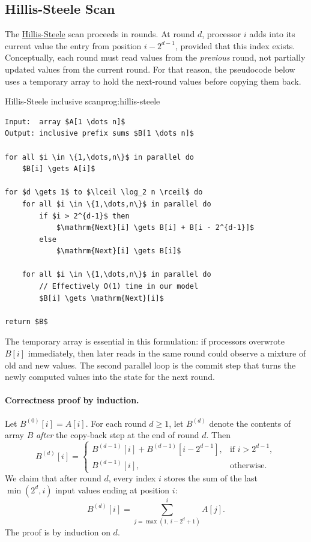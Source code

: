 \subsection{Hillis-Steele Scan}
The \hyperref[prog:hillis-steele]{Hillis-Steele} scan proceeds in rounds. At round $d$, processor $i$ adds into
its current value the entry from position $i - 2^{d-1}$, provided that this index
exists. Conceptually, each round must read values from the \emph{previous} round,
not partially updated values from the current round. For that reason, the
pseudocode below uses a temporary array to hold the next-round values before
copying them back.

\begin{ppprogram}{Hillis-Steele inclusive scan}{prog:hillis-steele}
\begin{lstlisting}[language=Pseudocode,style=pppseudocode]
Input:  array $A[1 \dots n]$
Output: inclusive prefix sums $B[1 \dots n]$

for all $i \in \{1,\dots,n\}$ in parallel do
    $B[i] \gets A[i]$

for $d \gets 1$ to $\lceil \log_2 n \rceil$ do
    for all $i \in \{1,\dots,n\}$ in parallel do
        if $i > 2^{d-1}$ then
            $\mathrm{Next}[i] \gets B[i] + B[i - 2^{d-1}]$
        else
            $\mathrm{Next}[i] \gets B[i]$

    for all $i \in \{1,\dots,n\}$ in parallel do  
        // Effectively O(1) time in our model
        $B[i] \gets \mathrm{Next}[i]$

return $B$
\end{lstlisting}
\end{ppprogram}

The temporary array is essential in this formulation: if processors overwrote
$B[i]$ immediately, then later reads in the same round could observe a mixture of
old and new values. The second parallel loop is the commit step that turns the
newly computed values into the state for the next round.

\paragraph{Correctness proof by induction.}
Let $B^{(0)}[i] = A[i]$. For each round $d \ge 1$, let $B^{(d)}$ denote the
contents of array $B$ \emph{after} the copy-back step at the end of round $d$.
Then
\[
B^{(d)}[i] =
\begin{cases}
B^{(d-1)}[i] + B^{(d-1)}[i - 2^{d-1}], & \text{if } i > 2^{d-1}, \\
B^{(d-1)}[i], & \text{otherwise}.
\end{cases}
\]
We claim that after round $d$, every index $i$ stores the sum of the last
$\min(2^d,i)$ input values ending at position $i$:
\[
B^{(d)}[i] = \sum_{j=\max(1,\, i - 2^d + 1)}^{i} A[j].
\]
The proof is by induction on $d$.


